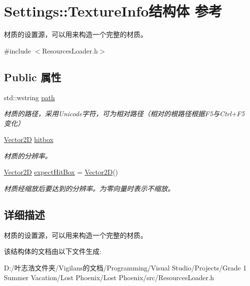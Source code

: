 \hypertarget{struct_settings_1_1_texture_info}{}\section{Settings\+:\+:Texture\+Info结构体 参考}
\label{struct_settings_1_1_texture_info}


材质的设置源，可以用来构造一个完整的材质。  




{\ttfamily \#include $<$Resources\+Loader.\+h$>$}

\subsection*{Public 属性}
\begin{DoxyCompactItemize}
\item 
\mbox{\label{struct_settings_1_1_texture_info_ae8163d14505552c69b973a262fb896f6}} 
std\+::wstring \hyperlink{struct_settings_1_1_texture_info_ae8163d14505552c69b973a262fb896f6}{path}
\begin{DoxyCompactList}\small\item\em 材质的路径，采用\+Unicode字符，可为相对路径（相对的根路径根据\+F5与\+Ctrl+\+F5变化） \end{DoxyCompactList}\item 
\mbox{\label{struct_settings_1_1_texture_info_a5b7e1f0b9d305faa03de6d0c31cc0859}} 
\hyperlink{structbasic__vector2_d}{Vector2D} \hyperlink{struct_settings_1_1_texture_info_a5b7e1f0b9d305faa03de6d0c31cc0859}{hitbox}
\begin{DoxyCompactList}\small\item\em 材质的分辨率。 \end{DoxyCompactList}\item 
\mbox{\label{struct_settings_1_1_texture_info_a4bec21902818b3afb2993e5d67a62dfe}} 
\hyperlink{structbasic__vector2_d}{Vector2D} \hyperlink{struct_settings_1_1_texture_info_a4bec21902818b3afb2993e5d67a62dfe}{expect\+Hit\+Box} = \hyperlink{structbasic__vector2_d}{Vector2D}()
\begin{DoxyCompactList}\small\item\em 材质经缩放后要达到的分辨率。为零向量时表示不缩放。 \end{DoxyCompactList}\end{DoxyCompactItemize}


\subsection{详细描述}
材质的设置源，可以用来构造一个完整的材质。 



该结构体的文档由以下文件生成\+:\begin{DoxyCompactItemize}
\item 
D\+:/叶志浩文件夹/\+Vigilans的文档/\+Programming/\+Visual Studio/\+Projects/\+Grade 1 Summer Vacation/\+Lost Phoenix/\+Lost Phoenix/src/Resources\+Loader.\+h\end{DoxyCompactItemize}
